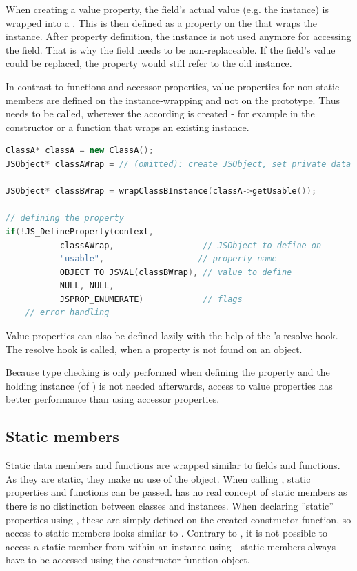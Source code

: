 When creating a value property, the field's actual value (e.g. the  instance) is wrapped into a . This is then defined as a property on the  that wraps the  instance. After property definition, the  instance is not used anymore for accessing the field. That is why the field needs to be non-replaceable. If the field's value could be replaced, the  property would still refer to the old instance.

In contrast to functions and accessor properties, value properties for non-static members are defined on the instance-wrapping  and not on the prototype. Thus  needs to be called, wherever the according  is created - for example in the constructor or a function that wraps an existing instance.

\SingleSpacing
\begin{lstlisting}[language=C++, caption=Defining a value property]
ClassA* classA = new ClassA();
JSObject* classAWrap = // (omitted): create JSObject, set private data

JSObject* classBWrap = wrapClassBInstance(classA->getUsable());

// defining the property
if(!JS_DefineProperty(context, 
           classAWrap,                  // JSObject to define on
           "usable",                   // property name
           OBJECT_TO_JSVAL(classBWrap), // value to define
           NULL, NULL,
           JSPROP_ENUMERATE)            // flags
	// error handling
\end{lstlisting}
\OnehalfSpacing

Value properties can also be defined lazily with the help of the 's resolve hook. The resolve hook is called, when a property is not found on an object.

Because type checking is only performed when defining the property and the holding instance (of ) is not needed afterwards, access to value properties has better performance than using accessor properties.

\subsection{Static members}

Static data members and functions are wrapped similar to fields and functions. As they are static, they make no use of the  object. When calling , static properties and functions can be passed.  has no real concept of static members as there is no distinction between classes and instances. When declaring ''static'' properties using , these are simply defined on the created constructor function, so access to static members looks similar to . Contrary to , it is not possible to access a static member from within an instance using  - static members always have to be accessed using the constructor function object.

